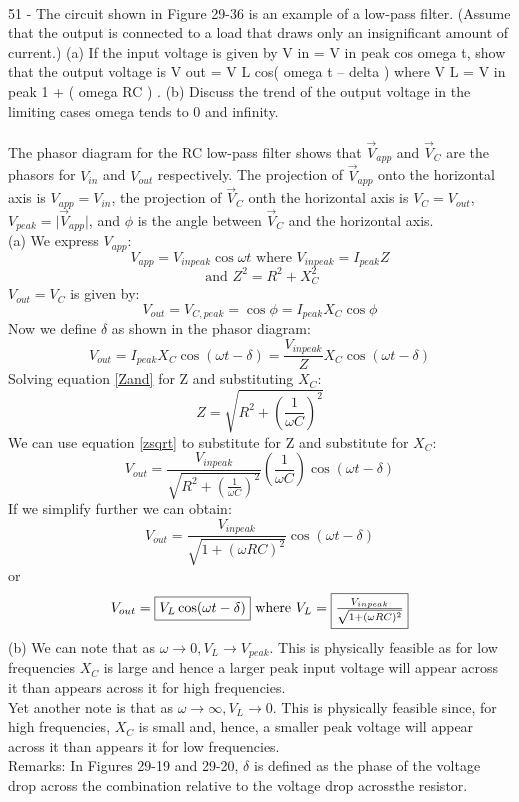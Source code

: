 \documentclass{report}
\begin{document}
\paragraph{}
51 - The circuit shown in Figure 29-36 is an example of a low-pass filter. (Assume that the output is connected to a load that draws only an insignificant amount of current.) (a) If the input voltage is given by V in = V in peak cos omega t, show that the output voltage is V out = V L cos( omega t – delta ) where V L = V in peak 1 + ( omega RC ) . (b) Discuss the trend of the output voltage in the limiting cases omega tends to 0 and infinity.\\
\\
The phasor diagram for the RC low-pass filter shows that $\vec V_{app}$ and $\vec V_C$ are the phasors for $V_{in}$ and $V_{out}$ respectively. The projection of $\vec V_{app}$ onto the horizontal axis is $V_{app} = V_{in}$, the projection of $\vec V_C$ onth the horizontal axis is $V_C = V_{out}$, $V_{peak} = \lvert \vec V_{app} \rvert$, and $\phi$ is the angle between $\vec V_C$ and the horizontal axis.\\
(a)
We express $V_{app}$:
$$V_{app} = V_{in peak} \cos \omega t \text{ where } V_{in peak} = I_{peak}Z$$
\begin{equation}\label{Zand}
  \text{ and } Z^2 = R^2 + X_C^2
\end{equation}
$V_{out} = V_C$ is given by:
$$V_{out} = V_{C,peak} = \cos \phi = I_{peak}X_C \cos \phi$$
Now we define $\delta$ as shown in the phasor diagram:
$$V_{out} = I_{peak}X_C \cos (\omega t - \delta) = \frac{V_{in peak}}{Z}X_C \cos (\omega t - \delta)$$
Solving equation \ref{Zand} for Z and substituting $X_C$:
\begin{equation}\label{zsqrt}
  Z = \sqrt{R^2 + \left( \frac{1}{\omega C} \right)^2}
\end{equation}
We can use equation \ref{zsqrt} to substitute for Z and substitute for $X_C$:
$$V_{out} = \frac{V_{in peak}}{\sqrt{R^2 + \left( \frac{1}{\omega C} \right)^2}} \left( \frac{1}{\omega C} \right) \cos (\omega t - \delta)$$
If we simplify further we can obtain:
$$V_{out} = \frac{V_{in peak}}{\sqrt{1 + (\omega RC)^2}} \cos (\omega t - \delta)$$
or
$$V_{out} = \fbox{$V_L \cos (\omega t - \delta)$} \text{ where } V_L = \fbox{$\frac{V_{in peak}}{\sqrt{1 + (\omega RC)^2}}$}$$
(b) We can note that as $\omega \rightarrow 0, V_L \rightarrow V_{peak}$. This is physically feasible as for low frequencies $X_C$ is large and hence a larger peak input voltage will appear across it than appears across it for high frequencies.\\
Yet another note is that as $\omega \rightarrow \infty, V_L \rightarrow 0$. This is physically feasible since, for high frequencies, $X_C$ is small and, hence, a smaller peak voltage will appear across it than appears it for low frequencies.\\
Remarks: In Figures 29-19 and 29-20, $\delta$ is defined as the phase of the
voltage drop across the combination relative to the voltage drop acrossthe resistor.
\end{document}
